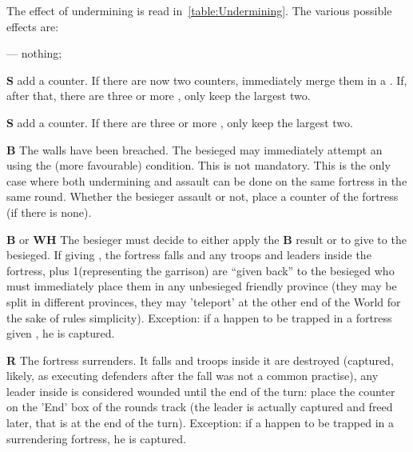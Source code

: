 The effect of undermining is read in~\ref{table:Undermining}. The various
possible effects are:
\begin{modlist}
\item[---] nothing;
\item[\textbf{S}\facemoins] add a \USURE\facemoins counter. If there are now
  two \USURE\facemoins counters, immediately merge them in a
  \USURE\faceplus. If, after that, there are three or more \USURE, only keep
  the largest two.
\item[\textbf{S}\faceplus] add a \USURE\faceplus counter. If there are three
  or more \USURE, only keep the largest two.
\item[\textbf{B}] The walls have been breached. The besieged may immediately
  attempt an  using the (more favourable) 
  condition. This  is not mandatory. This is the only case
  where both undermining and assault can be done on the same fortress in the
  same round. Whether the besieger assault or not, place a \BREACH counter of
  the fortress (if there is none).
\item[\textbf{B} or \textbf{WH}] The besieger must decide to either apply the
  \textbf{B} result or to give  to the besieged. If giving
  , the fortress falls and any troops and leaders inside the
  fortress, plus 1\LD (representing the garrison) are ``given back'' to the
  besieged who must immediately place them in any unbesieged friendly province
  (they may be split in different provinces, they may 'teleport' at the other
  end of the World for the sake of rules simplicity). Exception: if a
   happen to be trapped in a fortress given ,
  he is captured.
\item[\textbf{R}] The fortress surrenders. It falls and troops inside it are
  destroyed (captured, likely, as executing defenders after the fall was not a
  common practise), any leader inside is considered wounded until the end of
  the turn: place the counter on the 'End' box of the rounds track (the leader
  is actually captured and freed later, that is at the end of the turn).
  Exception: if a  happen to be trapped in a surrendering
  fortress, he is captured.
\end{modlist}


